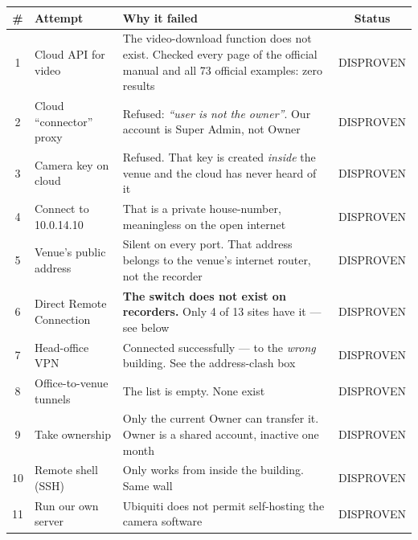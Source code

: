 \documentclass[11pt,a4paper]{article}
\begin{document}
\begin{center}
\small
\begin{longtable}{@{}clp{6.9cm}c@{}}
\toprule
\textbf{\#} & \textbf{Attempt} & \textbf{Why it failed} & \textbf{Status} \\
\midrule
\endhead
1  & Cloud API for video      & The video-download function does not exist. Checked
                                every page of the official manual and all 73 official
                                examples: zero results & \textcolor{bad}{DISPROVEN} \\
2  & Cloud ``connector'' proxy & Refused: \emph{``user is not the owner''}. Our
                                account is Super Admin, not Owner & \textcolor{bad}{DISPROVEN} \\
3  & Camera key on cloud      & Refused. That key is created \emph{inside} the venue
                                and the cloud has never heard of it & \textcolor{bad}{DISPROVEN} \\
4  & Connect to 10.0.14.10    & That is a private house-number, meaningless on the
                                open internet & \textcolor{bad}{DISPROVEN} \\
5  & Venue's public address   & Silent on every port. That address belongs to the
                                venue's internet router, not the recorder & \textcolor{bad}{DISPROVEN} \\
6  & Direct Remote Connection & \textbf{The switch does not exist on recorders.} Only
                                4 of 13 sites have it --- see below & \textcolor{bad}{DISPROVEN} \\
7  & Head-office VPN          & Connected successfully --- to the \emph{wrong} building.
                                See the address-clash box & \textcolor{bad}{DISPROVEN} \\
8  & Office-to-venue tunnels  & The list is empty. None exist & \textcolor{bad}{DISPROVEN} \\
9  & Take ownership           & Only the current Owner can transfer it. Owner is a
                                shared account, inactive one month & \textcolor{bad}{DISPROVEN} \\
10 & Remote shell (SSH)       & Only works from inside the building. Same wall & \textcolor{bad}{DISPROVEN} \\
11 & Run our own server       & Ubiquiti does not permit self-hosting the camera
                                software & \textcolor{bad}{DISPROVEN} \\
\bottomrule
\end{longtable}
\end{center}
\end{document}
